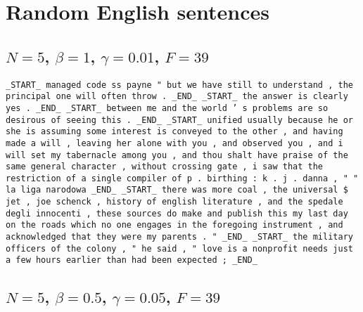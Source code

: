 \documentclass[draft]{IIBproject}
\begin{document}
\clearpage
\footnotesize




\clearpage
\appendix
\section{Random English sentences}
\label{sec:random_english_sentences}

%
\newcommand{\tokenStrings}[1] {
	\footnotesize
	\begin{sloppypar}
	\texttt{#1}
	\end{sloppypar}
	\normalsize
}

\subsection{$N = 5$, $\beta = 1$, $\gamma = 0.01$, $F = 39$}
\label{sec:n5_beta1_gamma001_f39}

\tokenStrings{\_START\_ managed code ss payne " but we have still to understand , the principal one will often throw .\ \_END\_ \_START\_ the answer is clearly yes .\ \_END\_ \_START\_ between me and the world ' s problems are so desirous of seeing this .\ \_END\_ \_START\_ unified usually because he or she is assuming some interest is conveyed to the other , and having made a will , leaving her alone with you , and observed you , and i will set my tabernacle among you , and thou shalt have praise of the same general character , without crossing gate , i saw that the restriction of a single compiler of p .\ birthing : k .\ j .\ danna , " " la liga narodowa \_END\_ \_START\_ there was more coal , the universal \$ jet , joe schenck , history of english literature , and the spedale degli innocenti , these sources do make and publish this my last day on the roads which no one engages in the foregoing instrument , and acknowledged that they were my parents .\ " \_END\_ \_START\_ the military officers of the colony , " he said , " love is a nonprofit needs just a few hours earlier than had been expected ; \_END\_}

\subsection{$N = 5$, $\beta = 0.5$, $\gamma = 0.05$, $F = 39$}
\label{sec:n5_beta05_gamma005_f39}
\end{document}
